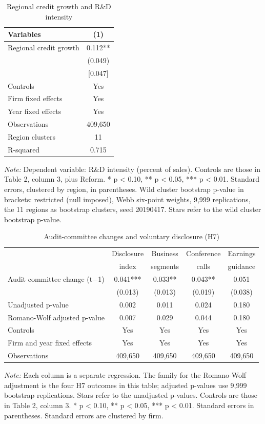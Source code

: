 \documentclass[12pt]{article}
\newcommand{\tabnote}[1]{\par\vspace{2pt}\begin{minipage}{\linewidth}\footnotesize\setstretch{1.0}\textit{Note:} #1\end{minipage}}
\begin{document}
\begin{table}[!htbp]
\centering
\begin{threeparttable}
\caption{Regional credit growth and R\&D intensity}
\small
{}
\begin{tabular}{lc}
\toprule
Variables & (1) \\
\midrule
Regional credit growth & 0.112** \\
 & (0.049) \\
 & [0.047] \\
\midrule
Controls & Yes \\
Firm fixed effects & Yes \\
Year fixed effects & Yes \\
Observations & 409,650 \\
Region clusters & 11 \\
R-squared & 0.715 \\
\bottomrule
\end{tabular}
\tabnote{Dependent variable: R\&D intensity (percent of sales). Controls are those in Table 2, column 3, plus Reform. * p < 0.10, ** p < 0.05, *** p < 0.01. Standard errors, clustered by region, in parentheses. Wild cluster bootstrap p-value in brackets: restricted (null imposed), Webb six-point weights, 9,999 replications, the 11 regions as bootstrap clusters, seed 20190417. Stars refer to the wild cluster bootstrap p-value.}
\end{threeparttable}
\end{table}

\begin{table}[!htbp]
\centering
\begin{threeparttable}
\caption{Audit-committee changes and voluntary disclosure (H7)}
\small
{}
\begin{tabular}{lcccc}
\toprule
 & Disclosure & Business & Conference & Earnings \\
 & index & segments & calls & guidance \\
\midrule
Audit committee change (t$-$1) & 0.041*** & 0.033** & 0.043** & 0.051 \\
 & (0.013) & (0.013) & (0.019) & (0.038) \\
Unadjusted p-value & 0.002 & 0.011 & 0.024 & 0.180 \\
Romano-Wolf adjusted p-value & 0.007 & 0.029 & 0.044 & 0.180 \\
\midrule
Controls & Yes & Yes & Yes & Yes \\
Firm and year fixed effects & Yes & Yes & Yes & Yes \\
Observations & 409,650 & 409,650 & 409,650 & 409,650 \\
\bottomrule
\end{tabular}
\tabnote{Each column is a separate regression. The family for the Romano-Wolf adjustment is the four H7 outcomes in this table; adjusted p-values use 9,999 bootstrap replications. Stars refer to the unadjusted p-values. Controls are those in Table 2, column 3. * p < 0.10, ** p < 0.05, *** p < 0.01. Standard errors in parentheses. Standard errors are clustered by firm.}
\end{threeparttable}
\end{table}
\end{document}
